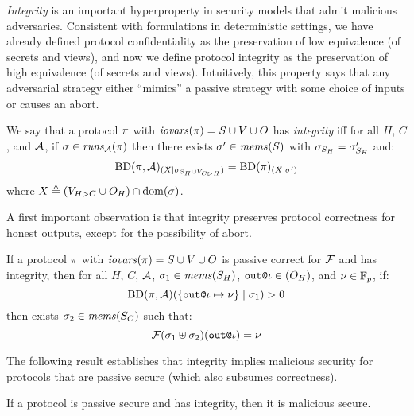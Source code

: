 \emph{Integrity} is an important hyperproperty in security models that admit
malicious adversaries. Consistent with formulations in deterministic settings,
we have already defined protocol confidentiality as the preservation of low equivalence
(of secrets and views), and now we define protocol integrity as the preservation
of high equivalence (of secrets and views). Intuitively, this property says
that any adversarial strategy either ``mimics'' a passive strategy with some
choice of inputs or causes an abort.
\begin{definition}[Integrity]
  \label{def-integrity}
  We say that a protocol $\pi$ with $\mathit{iovars}(\pi) = S \cup V \cup O$ has
  \emph{integrity} iff for all $H$, $C$, and $\mathcal{A}$,
  if $\sigma \in \mathit{runs}_{\mathcal{A}}(\pi)$ 
  then there exists $\sigma' \in \mathit{mems}(S)$ with $\sigma_{S_H} = \sigma'_{S_H} $ and:
    $$
    \mathrm{BD}(\pi,\mathcal{A})_{({X}|{\sigma_{S_H \cup V_{C \rhd H}}})} =
    \mathrm{BD}(\pi)_{({X}|{\sigma'})}
    $$ 
  where $X \triangleq (V_{H \rhd C} \cup O_H) \cap \mathrm{dom}(\sigma)$. 
\end{definition}
A first important observation is that integrity preserves protocol correctness
for honest outputs, except for the possibility of abort. 
\begin{lemma}
  \label{lemma-malicious-correct}
  If a protocol $\pi$ with $\mathit{iovars}(\pi) = S \cup V \cup O$ is passive correct for
  $\mathcal{F}$ and
  has integrity, then for all $H$, $C$, $\mathcal{A}$, $\sigma_1 \in \mathit{mems}(S_H)$,
  $\texttt{out}\texttt{@}\iota \in (O_H)$, and $\nu \in \mathbb{F}_p$, if:
  $$
  \mathrm{BD}(\pi,\mathcal{A})(\{ \texttt{out}\texttt{@}\iota \mapsto \nu \} \mid \sigma_1) > 0
  $$
  then exists $\sigma_2 \in \mathit{mems}(S_C)$ such that:
  $$
  \mathcal{F}(\sigma_1 \uplus \sigma_2)(\texttt{out}\texttt{@}\iota) = \nu
  $$
\end{lemma}
The following result establishes that integrity implies malicious
security for protocols that are passive secure (which also subsumes
correctness). 
\begin{theorem}
  \label{theorem-integrity}
  If a protocol is passive secure and has integrity, then it
  is malicious secure.
\end{theorem}

